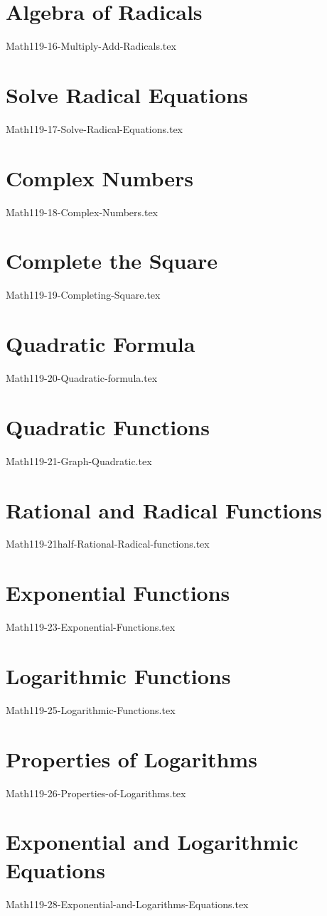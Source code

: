 \documentclass[11pt, math=mtpro2, color=blue, lang=en, mode=fancy]{CLS/elegantbookr}
\begin{document}

\chapter{Algebra of Radicals}
{Math119-16-Multiply-Add-Radicals.tex}
\newpage


\chapter{Solve Radical Equations}
{Math119-17-Solve-Radical-Equations.tex}
\newpage


\chapter{Complex Numbers}
{Math119-18-Complex-Numbers.tex}
\newpage

\chapter{Complete the Square}
{Math119-19-Completing-Square.tex}
\newpage


\chapter{Quadratic Formula}
{Math119-20-Quadratic-formula.tex}
\newpage


\chapter{Quadratic Functions}
{Math119-21-Graph-Quadratic.tex}
\newpage



\chapter{Rational and Radical Functions}
{Math119-21half-Rational-Radical-functions.tex}
\newpage


\chapter{Exponential Functions}
{Math119-23-Exponential-Functions.tex}
\newpage


\chapter{Logarithmic Functions}
{Math119-25-Logarithmic-Functions.tex}
\newpage

\chapter{Properties of Logarithms}
{Math119-26-Properties-of-Logarithms.tex}
\newpage

\chapter{Exponential and Logarithmic Equations}
{Math119-28-Exponential-and-Logarithms-Equations.tex}
\newpage
\end{document}
